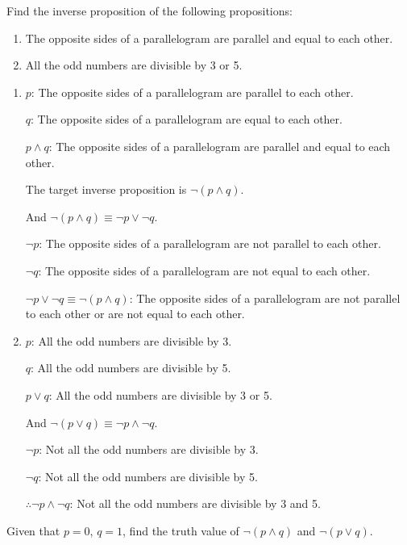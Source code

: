 \documentclass{report}
\newcounter{example}
\begin{document}
\vspace{0.5cm}
\begin{example}
    \item Find the inverse proposition of the following propositions:
    \begin{enumerate}[label=(\alph*)]
        \item The opposite sides of a parallelogram are parallel and equal to each other.
        \item All the odd numbers are divisible by 3 or 5.
    \end{enumerate}
\end{example}
\begin{solution}
    \item \begin{enumerate}[label=(\alph*)]
        \item $p$: The opposite sides of a parallelogram are parallel to each other.

              $q$: The opposite sides of a parallelogram are equal to each other.

              $p \land q$: The opposite sides of a parallelogram are parallel and equal to each other.

              The target inverse proposition is $\neg(p \land q)$.

              And $\neg(p \land q) \equiv \neg p \lor \neg q$.

              $\neg p$: The opposite sides of a parallelogram are not parallel to each other.

              $\neg q$: The opposite sides of a parallelogram are not equal to each other.

              $\neg p \lor \neg q \equiv \neg(p \land q)$: The opposite sides of a parallelogram are not parallel to each other or are not equal to each other.

        \item $p$: All the odd numbers are divisible by 3.

              $q$: All the odd numbers are divisible by 5.

              $p \lor q$: All the odd numbers are divisible by 3 or 5.

              And $\neg(p \lor q) \equiv \neg p \land \neg q$.

              $\neg p$: Not all the odd numbers are divisible by 3.

              $\neg q$: Not all the odd numbers are divisible by 5.

              $\therefore \neg p \land \neg q$: Not all the odd numbers are divisible by 3 and 5.
    \end{enumerate}
\end{solution}
\vspace{0.1cm}
\begin{example}
    \item Given that $p = 0$, $q = 1$, find the truth value of $\neg (p \land q)$ and
    $\neg (p \lor q)$.
\end{example}
\end{document}
